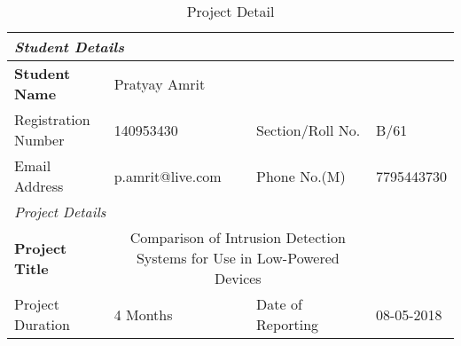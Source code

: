 
\begin{table}
\begin{scriptsize}
\caption{Project Detail}
\begin{tabularx}{\textwidth}{|X|X|X|X|}
\multicolumn{4}{l}{\textit{Student Details}}\\
\hline
\textbf{Student Name}&\multicolumn{2}{X}{Pratyay Amrit}&\\ \hline
Registration Number&140953430&Section/Roll No.& B/61\\ \hline
Email Address&\tiny{p.amrit@live.com}&Phone No.(M)&7795443730 \\  \hline
\multicolumn{4}{l}{\textit{Project Details}}\\ \hline
\textbf{Project Title}&\multicolumn{2}{c}{\tiny{Comparison of Intrusion Detection Systems for Use in Low-Powered Devices}}& \\ \hline
Project Duration& 4 Months&Date of Reporting& 08-05-2018 \\ \hline

\end{tabularx}
\end{scriptsize}
\end{table}
